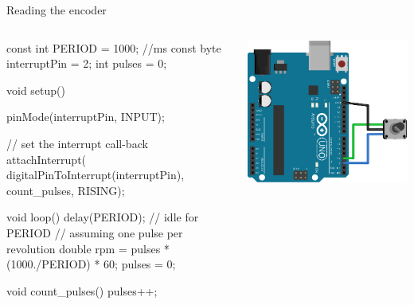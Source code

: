 \documentclass[compress]{beamer}
\begin{document}
\begin{frame}[fragile]{Reading the encoder}
        \begin{columns}
            \begin{column}{0.6\linewidth}

\begin{cppcode}
const int PERIOD = 1000; //ms
const byte interruptPin = 2;
int pulses = 0;

void setup() {
  pinMode(interruptPin, INPUT);

  // set the interrupt call-back
  attachInterrupt(
        digitalPinToInterrupt(interruptPin), 
        count_pulses, RISING);
}

void loop() {
    delay(PERIOD); // idle for PERIOD
    // assuming one pulse per revolution
    double rpm = pulses * (1000./PERIOD) * 60;
    pulses = 0;
}

void count_pulses() {
  pulses++;
}
\end{cppcode}
            \end{column}
            \begin{column}{0.4\linewidth}
                \begin{center}
                    \includegraphics[width=\linewidth]{../part1/figs/arduino-encoder}
                \end{center}
            \end{column}
        \end{columns}


\end{frame}
\end{document}
